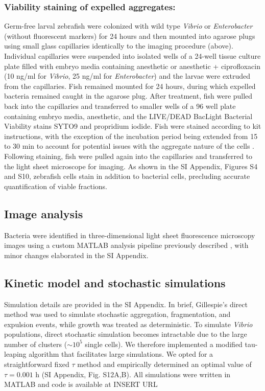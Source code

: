  \subsubsection{Viability staining of expelled aggregates:}  Germ-free larval zebrafish were colonized with wild type \textit{Vibrio} or \textit{Enterobacter} (without fluorescent markers) for 24 hours and then mounted into agarose plugs using small glass capillaries identically to the imaging procedure (above). Individual capillaries were suspended into isolated wells of a 24-well tissue culture plate filled with embryo media containing anesthetic or anesthetic + ciprofloxacin (10 ng/ml for \textit{Vibrio}, 25 ng/ml for \textit{Enterobacter}) and the larvae were extruded from the capillaries. Fish remained mounted for 24 hours, during which expelled bacteria remained caught in the agarose plug. After treatment, fish were pulled back into the capillaries and transferred to smaller wells of a 96 well plate containing embryo media, anesthetic, and the LIVE/DEAD BacLight Bacterial Viability stains SYTO9 and propridium iodide. Fish were stained according to kit instructions, with the exception of the incubation period being extended from 15 to 30 min to account for potential issues with the aggregate nature of the cells \cite{netuschil2014confusion}.  Following staining, fish were pulled again into the capillaries and transferred to the light sheet microscope for imaging. As shown in the SI Appendix, Figures S4 and S10, zebrafish cells stain in addition to bacterial cells, precluding accurate quantification of viable fractions.

 \subsection{Image analysis}

Bacteria were identified in three-dimensional light sheet fluorescence microscopy images using a custom MATLAB analysis pipeline previously described \cite{Jemielita2014,schlomann2018bacterial}, with minor changes elaborated in the SI Appendix.


 \subsection{Kinetic model and stochastic simulations}
Simulation details are provided in the SI Appendix. In brief, Gillespie's direct method \cite{gillespie1977exact} was used to simulate stochastic aggregation, fragmentation, and expulsion events, while growth was treated as deterministic. To simulate \textit{Vibrio} populations, direct stochastic simulation becomes intractable due to the large number of clusters ($\sim 10^5$ single cells). We therefore implemented a modified tau-leaping algorithm \cite{gillespie2001approximate} that facilitates large simulations. We opted for a straightforward fixed $\tau$ method and empirically determined an optimal value of $\tau = 0.001$ h (SI Appendix, Fig. S12A,B). All simulations were written in MATLAB and code is available at INSERT URL %






